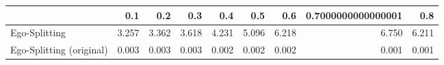 \begin{tabular}{lrrrrrrrr}
\toprule
{} &   0.1 &   0.2 &   0.3 &   0.4 &   0.5 &   0.6 & 0.7000000000000001 &   0.8 \\
\midrule
Ego-Splitting            & 3.257 & 3.362 & 3.618 & 4.231 & 5.096 & 6.218 &              6.750 & 6.211 \\
Ego-Splitting (original) & 0.003 & 0.003 & 0.003 & 0.002 & 0.002 & 0.002 &              0.001 & 0.001 \\
\bottomrule
\end{tabular}
